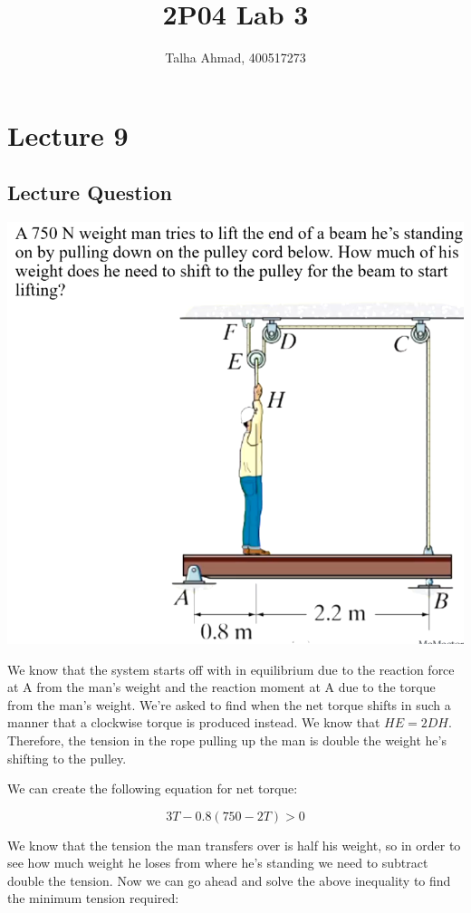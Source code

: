 \documentclass{article}[14pt, letterpaper, Times New Roman]
\title{2P04 Lab 3}
\author{Talha Ahmad, 400517273}
\begin{document}
\maketitle

\section{Lecture 9}

\subsection{Lecture Question}

\includegraphics[width=15cm]{l9-lq.png}

We know that the system starts off with in equilibrium due to the reaction force at A from the man's weight and the reaction moment at A due to the torque from the man's weight.
We're asked to find when the net torque shifts in such a manner that a clockwise torque is produced instead.
We know that $HE = 2DH$.
Therefore, the tension in the rope pulling up the man is double the weight he's shifting to the pulley.

We can create the following equation for net torque:

\[ 3T - 0.8(750 - 2T) > 0 \]

We know that the tension the man transfers over is half his weight, so in order to see how much weight he loses from where he's standing we need to subtract double the tension.
Now we can go ahead and solve the above inequality to find the minimum tension required:
\end{document}
